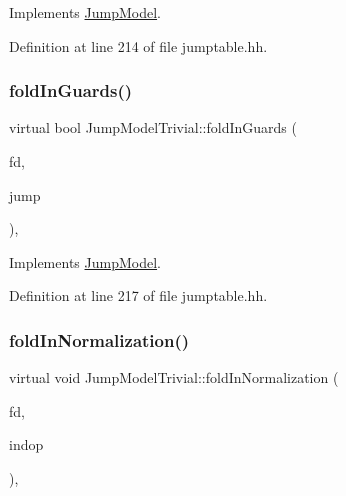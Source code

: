 Implements \mbox{\hyperlink{class_jump_model_aac83f52fbf3ee566e760dfabe6e67ee6}{Jump\+Model}}.



Definition at line 214 of file jumptable.\+hh.

\mbox{\label{class_jump_model_trivial_a063b80b921795c341598e643f5ee7cce}} 
\subsubsection{\texorpdfstring{foldInGuards()}{foldInGuards()}}
{\footnotesize\ttfamily virtual bool Jump\+Model\+Trivial\+::fold\+In\+Guards (\begin{DoxyParamCaption}\item[{\mbox{\hyperlink{class_funcdata}{Funcdata}} $\ast$}]{fd,  }\item[{\mbox{\hyperlink{class_jump_table}{Jump\+Table}} $\ast$}]{jump }\end{DoxyParamCaption})\hspace{0.3cm}{\ttfamily [inline]}, {\ttfamily [virtual]}}



Implements \mbox{\hyperlink{class_jump_model_a6f40ba77ddc8f4cf40f6071248103d9c}{Jump\+Model}}.



Definition at line 217 of file jumptable.\+hh.

\mbox{\label{class_jump_model_trivial_a942b0f44fb8ff1fc692914cc26894cc1}} 
\subsubsection{\texorpdfstring{foldInNormalization()}{foldInNormalization()}}
{\footnotesize\ttfamily virtual void Jump\+Model\+Trivial\+::fold\+In\+Normalization (\begin{DoxyParamCaption}\item[{\mbox{\hyperlink{class_funcdata}{Funcdata}} $\ast$}]{fd,  }\item[{\mbox{\hyperlink{class_pcode_op}{Pcode\+Op}} $\ast$}]{indop }\end{DoxyParamCaption})\hspace{0.3cm}{\ttfamily [inline]}, {\ttfamily [virtual]}}



